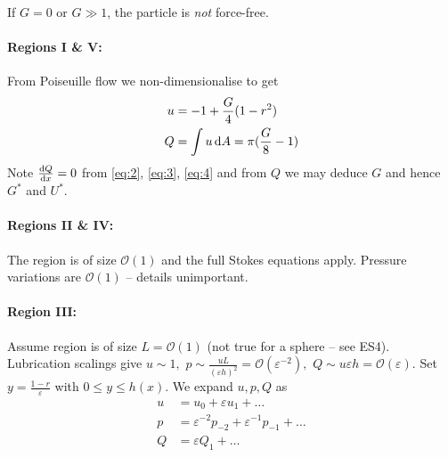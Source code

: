 \documentclass{jknotes}
\begin{document}
If $G = 0$ or $G \gg 1$, the particle is \emph{not} force-free.

\paragraph{Regions I \& V:}
From Poiseuille flow we non-dimensionalise to get
\begin{align}
	u &= -1 + \frac{G}{4}(1-r^2) \\
	Q &= \int u \, \diffd A = \pi (\frac{G}{8} - 1)
\end{align}
Note $\frac{\diffd Q}{\diffd x} = 0$ from \eqref{eq:2}, \eqref{eq:3},
\eqref{eq:4} and from $Q$ we may deduce $G$ and hence $G^*$ and $U^*$.

\paragraph{Regions II \& IV:} The region is of size $\mathcal{O}(1)$ and the
full Stokes equations apply. Pressure variations are $\mathcal{O}(1)$ --
details unimportant.

\paragraph{Region III:} Assume region is of size $L = \mathcal{O}(1)$ (not
true for a sphere -- see ES4). Lubrication scalings give $u \sim 1, \,\,p \sim
\frac{uL}{(\varepsilon h)^2} = \mathcal{O}(\varepsilon^{-2}), \,\,Q \sim u
\varepsilon h = \mathcal{O}(\varepsilon)$. Set $y = \frac{1-r}{\varepsilon}$
with $0 \le y \le h(x)$. We expand $u, p, Q$ as
\begin{align}
	u &= u_0 + \varepsilon u_1 + \dots \\
	p &= \varepsilon^{-2} p_{-2} + \varepsilon^{-1} p_{-1} + \dots \\
	Q &= \varepsilon Q_1 + \dots
\end{align}
\end{document}
